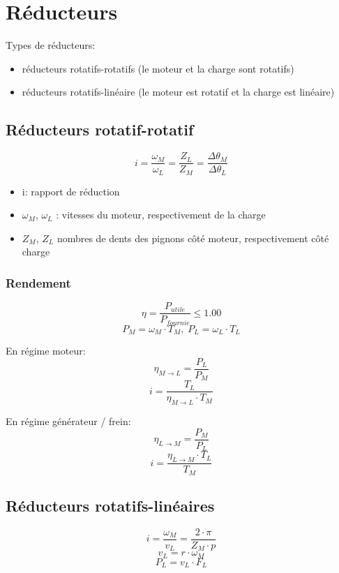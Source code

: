 \documentclass[12pt, twocolumn]{article}
\begin{document}
	\section*{Réducteurs}
		
		Types de réducteurs:
		
		\begin{itemize}
			\item réducteurs rotatifs-rotatifs (le moteur et la charge sont rotatifs)
			\item réducteurs rotatifs-linéaire (le moteur est rotatif et la charge est linéaire)
		\end{itemize}
	
		\subsection*{Réducteurs rotatif-rotatif}
		
		
			\[i = \frac{\omega_M}{\omega_L} = \frac{Z_L}{Z_M} = \frac{\Delta \theta_M}{\Delta \theta_L} \]
		
			\begin{itemize}
				\item i: rapport de réduction
				\item $\omega_M$, $\omega_L$ : vitesses du moteur, respectivement de la charge
				\item $Z_M$, $Z_L$ nombres de dents des pignons côté moteur, respectivement côté charge
			\end{itemize}
		
		\subsubsection*{Rendement}
		
			\[\eta = \frac{P_{utile}}{P_{fournie}} \leq 1.00 \]
			\[P_M = \omega_M \cdot T_M,\; P_L= \omega_L \cdot T_L \]
			
			En régime moteur:
			\[\eta_{M \rightarrow L} = \frac{P_L}{P_M} \]
			\[i = \frac{T_L}{\eta_{M \rightarrow L} \cdot T_M} \]
			
			En régime générateur / frein:
			\[\eta_{L \rightarrow M} = \frac{P_M}{P_L} \]
			\[i = \frac{\eta_{L \rightarrow M} \cdot T_L}{T_M} \]
		
		\subsection*{Réducteurs rotatifs-linéaires}
		
			\[i = \frac{\omega_M}{v_L} = \frac{2 \cdot \pi}{Z_M \cdot p} \]
			\[v_L = r \cdot \omega_M \]
			\[P_L = v_L \cdot F_L \]
			
\end{document}

